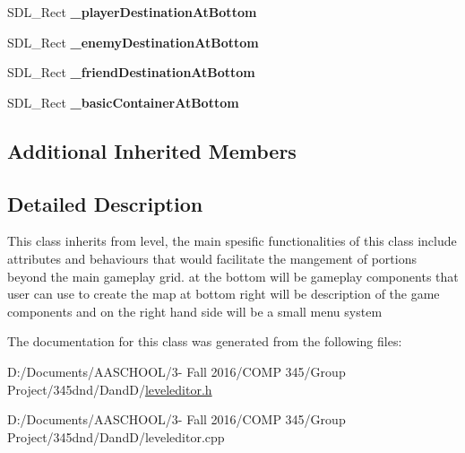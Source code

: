 \begin{DoxyCompactItemize}
\item 
\hypertarget{class_level_editor_a96b67be32e0a946ebca8e97ab508048c}{}\label{class_level_editor_a96b67be32e0a946ebca8e97ab508048c} 
S\+D\+L\+\_\+\+Rect {\bfseries \+\_\+player\+Destination\+At\+Bottom}
\item 
\hypertarget{class_level_editor_ae91bdd589e1538b7fc29c3d3392d7630}{}\label{class_level_editor_ae91bdd589e1538b7fc29c3d3392d7630} 
S\+D\+L\+\_\+\+Rect {\bfseries \+\_\+enemy\+Destination\+At\+Bottom}
\item 
\hypertarget{class_level_editor_a670f6dec91c54fd2ad493fbeb66f0bbd}{}\label{class_level_editor_a670f6dec91c54fd2ad493fbeb66f0bbd} 
S\+D\+L\+\_\+\+Rect {\bfseries \+\_\+friend\+Destination\+At\+Bottom}
\item 
\hypertarget{class_level_editor_a32538e3d011bb4c9e214113023594b99}{}\label{class_level_editor_a32538e3d011bb4c9e214113023594b99} 
S\+D\+L\+\_\+\+Rect {\bfseries \+\_\+basic\+Container\+At\+Bottom}
\end{DoxyCompactItemize}
\subsection*{Additional Inherited Members}


\subsection{Detailed Description}
This class inherits from level, the main spesific functionalities of this class include attributes and behaviours that would facilitate the mangement of portions beyond the main gameplay grid. at the bottom will be gameplay components that user can use to create the map at bottom right will be description of the game components and on the right hand side will be a small menu system 

The documentation for this class was generated from the following files\+:\begin{DoxyCompactItemize}
\item 
D\+:/\+Documents/\+A\+A\+S\+C\+H\+O\+O\+L/3-\/ Fall 2016/\+C\+O\+M\+P 345/\+Group Project/345dnd/\+Dand\+D/\hyperlink{leveleditor_8h}{leveleditor.\+h}\item 
D\+:/\+Documents/\+A\+A\+S\+C\+H\+O\+O\+L/3-\/ Fall 2016/\+C\+O\+M\+P 345/\+Group Project/345dnd/\+Dand\+D/leveleditor.\+cpp\end{DoxyCompactItemize}

